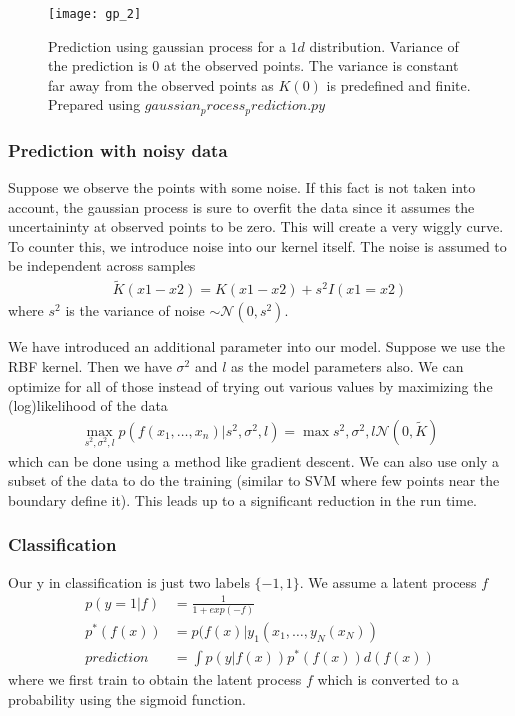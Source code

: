 \documentclass[../../statistical_learning_notes.tex]{subfiles}
\begin{document}
\begin{figure}[h]
\texttt{[image: gp\_2]}
\centering
\caption{Prediction using gaussian process for a $1d$ distribution. Variance of the prediction is $0$ at the observed points. The variance is constant far away from the observed points as $K(0)$ is predefined and finite. Prepared using $gaussian_process_prediction.py$}
\label{fig:gp_2} %
\end{figure}


\subsubsection*{Prediction with noisy data}
Suppose we observe the points with some noise. If this fact is not taken into account, the gaussian process is sure to overfit the data since it assumes the uncertaininty at observed points to be zero. This will create a very wiggly curve. To counter this, we introduce noise into our kernel itself. The noise is assumed to be independent across samples
\begin{align*}
    \tilde{K}(x1- x2) = K(x1 - x2) + s^{2}I(x1 = x2)
\end{align*}
where $s^{2}$ is the variance of noise $\sim \mathcal{N}(0, s^{2})$.\newline

We have introduced an additional parameter into our model. Suppose we use the RBF kernel. Then we have $\sigma^{2}$ and $l$ as the model parameters also. We can optimize for all of those instead of trying out various values by maximizing the (log)likelihood of the data
\begin{align*}
    \max_{s^{2}, \sigma^{2}, l} p(f(x_{1}, \ldots, x_{n})|s^{2}, \sigma^{2}, l)
    = \max{s^{2}, \sigma^{2}, l} \mathcal{N}(0, \tilde{K})
\end{align*}
which can be done using a method like gradient descent. We can also use only a subset of the data to do the training (similar to SVM where few points near the boundary define it). This leads up to a significant reduction in the run time.


\subsubsection*{Classification}
Our y in classification is just two labels $\{-1,1 \}$. We assume a latent process $f$
\begin{align*}
    p(y=1|f) &= \frac{1}{1 + exp(-f)}\\
    p^{*}(f(x)) &= p(f(x) | y_{1}(x_{1}, \ldots, y_{N}(x_{N}))\\
    prediction &= \int p(y|f(x))p^{*}(f(x)) d(f(x))
\end{align*}
where we first train to obtain the latent process $f$ which is converted to a probability using the sigmoid function.
\end{document}
